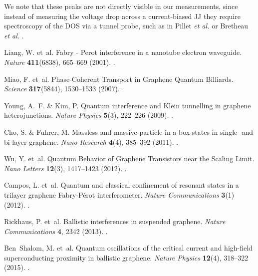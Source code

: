 \documentclass[preprint,
  onecolumn,
  notitlepage,
  amsmath,amssymb,
  aip,
  apl,
]{revtex4-1}
\begin{document}
We note that these peaks are not directly visible in our measurements, since instead of measuring the voltage drop across a current-biased JJ they require spectroscopy of the DOS via a tunnel probe, such as in Pillet \emph{et al.} or Bretheau \emph{et al.} \cite{pillet_andreev_2010a,bretheau_tunnelling_2017a}.	


\begin{thebibliography}{10}
    Liang, W. et~al.
    \newblock Fabry - {{Perot}} interference in a nanotube electron waveguide.
    \newblock \emph{Nature} \textbf{411}(6838), 665--669 (2001).
    \newblock {}.

    Miao, F. et~al.
    \newblock Phase-{{Coherent Transport}} in {{Graphene Quantum Billiards}}.
    \newblock \emph{Science} \textbf{317}(5844), 1530--1533 (2007).
    \newblock {}.

    Young, A.~F. \& Kim, P.
    \newblock Quantum interference and {{Klein}} tunnelling in graphene
      heterojunctions.
    \newblock \emph{Nature Physics} \textbf{5}(3), 222--226 (2009).
    \newblock {}.

    Cho, S. \& Fuhrer, M.
    \newblock Massless and massive particle-in-a-box states in single- and bi-layer
      graphene.
    \newblock \emph{Nano Research} \textbf{4}(4), 385--392 (2011).
    \newblock {}.

    Wu, Y. et~al.
    \newblock Quantum {{Behavior}} of {{Graphene Transistors}} near the {{Scaling
      Limit}}.
    \newblock \emph{Nano Letters} \textbf{12}(3), 1417--1423 (2012).
    \newblock {}.

    Campos, L. et~al.
    \newblock Quantum and classical confinement of resonant states in a trilayer
      graphene {{Fabry}}-{{P{\'e}rot}} interferometer.
    \newblock \emph{Nature Communications} \textbf{3}(1) (2012).
    \newblock {}.

    Rickhaus, P. et~al.
    \newblock Ballistic interferences in suspended graphene.
    \newblock \emph{Nature Communications} \textbf{4}, 2342 (2013).
    \newblock {}.

    Ben~Shalom, M. et~al.
    \newblock Quantum oscillations of the critical current and high-field
      superconducting proximity in ballistic graphene.
    \newblock \emph{Nature Physics} \textbf{12}(4), 318--322 (2015).
    \newblock {}.


\end{thebibliography}
\end{document}
